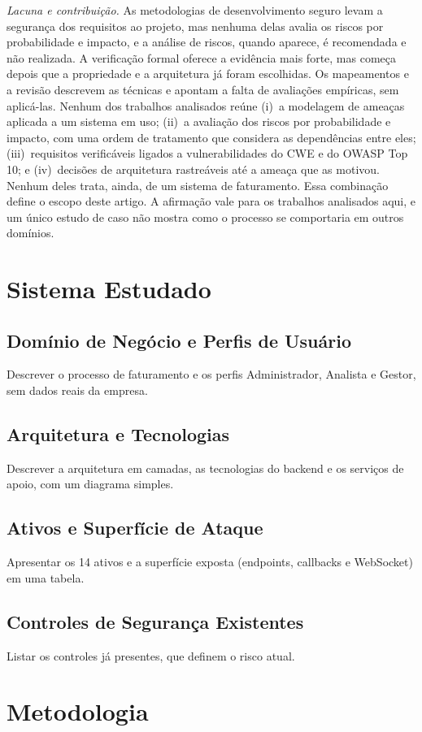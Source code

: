 \documentclass[conference]{IEEEtran}
\begin{document}
\emph{Lacuna e contribuição.} As metodologias de desenvolvimento seguro levam a segurança dos requisitos ao projeto, mas nenhuma delas avalia os riscos por probabilidade e impacto, e a análise de riscos, quando aparece, é recomendada e não realizada. A verificação formal oferece a evidência mais forte, mas começa depois que a propriedade e a arquitetura já foram escolhidas. Os mapeamentos e a revisão descrevem as técnicas e apontam a falta de avaliações empíricas, sem aplicá-las. Nenhum dos trabalhos analisados reúne (i)~a modelagem de ameaças aplicada a um sistema em uso; (ii)~a avaliação dos riscos por probabilidade e impacto, com uma ordem de tratamento que considera as dependências entre eles; (iii)~requisitos verificáveis ligados a vulnerabilidades do CWE e do OWASP Top 10; e (iv)~decisões de arquitetura rastreáveis até a ameaça que as motivou. Nenhum deles trata, ainda, de um sistema de faturamento. Essa combinação define o escopo deste artigo. A afirmação vale para os trabalhos analisados aqui, e um único estudo de caso não mostra como o processo se comportaria em outros domínios.

\section{Sistema Estudado}
\label{sec:sistema}
\subsection{Domínio de Negócio e Perfis de Usuário}
Descrever o processo de faturamento e os perfis Administrador, Analista e Gestor, sem dados reais da empresa.
\subsection{Arquitetura e Tecnologias}
Descrever a arquitetura em camadas, as tecnologias do backend e os serviços de apoio, com um diagrama simples.
\subsection{Ativos e Superfície de Ataque}
Apresentar os 14 ativos e a superfície exposta (endpoints, callbacks e WebSocket) em uma tabela.
\subsection{Controles de Segurança Existentes}
Listar os controles já presentes, que definem o risco atual.

\section{Metodologia}
\label{sec:metodologia}
\end{document}
